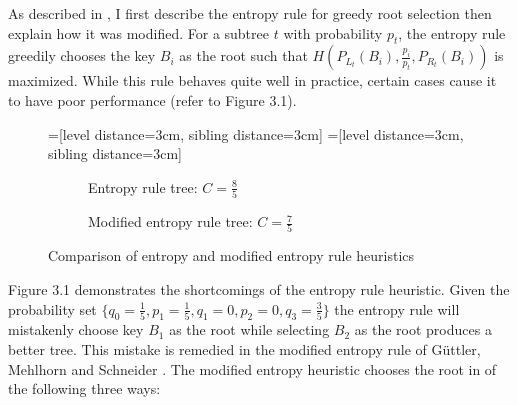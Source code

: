 \documentclass[letterpaper,12pt,titlepage,oneside,final]{book}
\theoremstyle{plain}
\begin{document}
As described in \cite{guttler1980binary}, I first describe the entropy rule for greedy root selection then explain how it was modified. For a subtree $t$ with probability $p_t$, the entropy rule greedily chooses the key $B_i$ as the root such that $H(P_{L_t}(B_i), \frac{p_i}{p_t}, P_{R_t}(B_i))$ is maximized. While this rule behaves quite well in practice, certain cases cause it to have poor performance (refer to Figure 3.1). 


\begin{figure}[H]
\centering
=[level distance=3cm, sibling distance=3cm]
=[level distance=3cm, sibling distance=3cm]
\scriptsize
\begin{subfigure}{.46\textwidth}
\centering
{}
\caption{Entropy rule tree: $C=\frac{8}{5}$}
\end{subfigure}
\begin{subfigure}{.46\textwidth}
\centering
{}
\caption{Modified entropy rule tree: $C=\frac{7}{5}$}
\end{subfigure}
\caption{Comparison of entropy and modified entropy rule heuristics}
\end{figure}

Figure 3.1 demonstrates the shortcomings of the entropy rule heuristic. Given the probability set $\{q_0 = \frac{1}{5}, p_1 = \frac{1}{5}, q_1 = 0, p_2 = 0, q_3 = \frac{3}{5}\}$ the entropy rule will mistakenly choose key $B_1$ as the root while selecting $B_2$ as the root produces a better tree. This mistake is remedied in the modified entropy rule of G{\"u}ttler, Mehlhorn and Schneider \cite{guttler1980binary}. The modified entropy heuristic chooses the root in of the following three ways:
\end{document}
